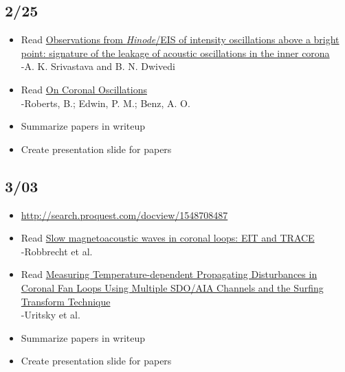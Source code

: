 \documentclass[12pt]{article}
\begin{document}
\subsection*{2/25}
\begin{itemize}
    \item Read
        \href{http://cdsads.u-strasbg.fr/abs/2010MNRAS.405.2317S}
        {\textcolor{cobalt}{Observations from \emph{Hinode}/EIS of
        intensity oscillations above a bright point: signature of the
        leakage of acoustic oscillations in the inner corona}}\\
        -A. K. Srivastava and B. N. Dwivedi
    \item Read
        \href{http://cdsads.u-strasbg.fr/abs/1984ApJ...279..857R}
        {\textcolor{cobalt}{On Coronal Oscillations}}\\
        -Roberts, B.; Edwin, P. M.; Benz, A. O.
    \item Summarize papers in writeup
    \item Create presentation slide for papers
\end{itemize}

\subsection*{3/03}
\begin{itemize}
    \item \url{http://search.proquest.com/docview/1548708487}
    \item Read
        \href{http://cdsads.u-strasbg.fr/abs/2001A\%26A...370..591R}
        {\textcolor{cobalt}{Slow magnetoacoustic waves in coronal loops:
        EIT and TRACE}}\\
        -Robbrecht et al.
    \item Read
        \href{http://cdsads.u-strasbg.fr/abs/2013ApJ...778...26U}
        {\textcolor{cobalt}{Measuring Temperature-dependent
        Propagating Disturbances in Coronal Fan Loops
        Using Multiple SDO/AIA Channels and the Surfing Transform Technique}}\\
        -Uritsky et al.
    \item Summarize papers in writeup
    \item Create presentation slide for papers
\end{itemize}
\end{document}
